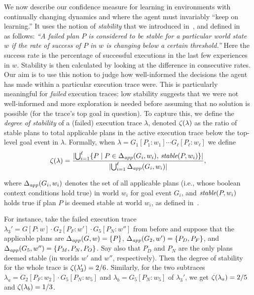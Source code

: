 We now describe our confidence measure for learning in environments with continually changing dynamics and where the agent must invariably ``keep on learning.'' It uses the notion of {\em stability} that we introduced in~\cite{airiau09:enhancing}, and defined in ~\cite{singh10:learning} as follows:
%
\emph{``A failed plan $P$ is considered to be stable for a particular world state $w$ if the rate of success of $P$ in $w$ is changing below a certain threshold.''}
Here the success rate is the percentage of successful executions in the last few experiences in $w$. Stability is then calculated by looking at the difference in consecutive rates.
%
Our aim is to use this notion to judge how  well-informed the decisions the agent has made within a particular execution trace were. This is particularly meaningful for \emph{failed} execution traces: low stability suggests that we were not well-informed and more exploration is needed before assuming that no solution is possible (for the trace's top goal in question).
To capture this, we define the \emph{degree of stability} of a (failed) execution trace $\lambda$, denoted $\zeta(\lambda)$ as the ratio of stable plans to total applicable plans in the active execution trace below the top-level goal event in $\lambda$. Formally, when $\lambda= G_1[P_1:w_1] \cdots G_\ell[P_\ell:w_\ell]$ we define 
\[
\zeta(\lambda) = 
	\frac{ 
			|{ \bigcup_{i=1}^\ell \{P \mid P \in \Delta_{\operatorname{\textit{app}}}(G_i,w_i),\, \operatorname{\textit{stable}}(P,w_i)\} }| 
		}
		{
			|{	\bigcup_{i=1}^\ell \Delta_{\operatorname{\textit{app}}}(G_i,w_i) }| 
		},
\]

\noindent
where  $\Delta_{\operatorname{\textit{app}}}(G_i,w_i)$ denotes the set of all applicable plans (i.e., whose boolean context conditions hold true) in world $w_i$ for goal event $G_i$, and $\operatorname{\textit{stable}}(P,w_i)$ holds true if plan $P$ is deemed stable at world $w_i$, as defined in~\cite{singh10:learning}.

For instance, take the failed execution trace $\lambda_3' = G[P:w] \cdot G_2[P_F:w'] \cdot G_5[P_N:w'']$ from before and suppose that the applicable plans are $\Delta_{\operatorname{\textit{app}}}(G,w) = \{P\}$, $\Delta_{\operatorname{\textit{app}}}(G_2,w') = \{P_D,P_F\}$, and $\Delta_{\operatorname{\textit{app}}}(G_5,w'') = \{P_M,P_N,P_O\}$. Say also that $P_D$ and $P_N$ are the only plans deemed stable (in worlds $w'$ and $w''$, respectively). 
Then the degree of stability for the whole trace is $\zeta(\lambda_3')= 2/6$.
Similarly, for the two subtraces $\lambda_a= G_2[P_F:w_2] \cdot G_5[P_N:w_5]$ and $\lambda_b =G_5[P_N:w_5]$ of $\lambda_3'$, we get $\zeta(\lambda_a) = 2/5$ and $\zeta(\lambda_b) = 1/3$.



